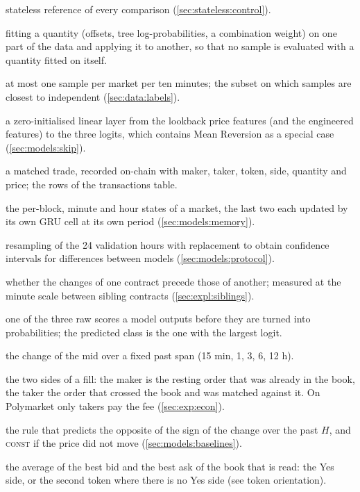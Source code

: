 \begin{description}[nosep, font=\normalfont\itshape, leftmargin=3.2cm, style=nextline]
  stateless reference of every comparison (\cref{sec:stateless:control}).
  \item[cross-fitting] fitting a quantity (offsets, tree log-probabilities, a combination
  weight) on one part of the data and applying it to another, so that no sample is
  evaluated with a quantity fitted on itself.
  \item[deduplicated samples] at most one sample per market per ten minutes; the subset
  on which samples are closest to independent (\cref{sec:data:labels}).
  \item[direct path] a zero-initialised linear layer from the lookback price features (and
  the engineered features) to the three logits, which contains Mean Reversion as a special case
  (\cref{sec:models:skip}).
  \item[fill] a matched trade, recorded on-chain with maker, taker, token, side, quantity
  and price; the rows of the transactions table.
  \item[hierarchical memory] the per-block, minute and hour states of a market, the last
  two each updated by its own GRU cell at its own period (\cref{sec:models:memory}).
  \item[hour-block bootstrap] resampling of the 24 validation hours with replacement to
  obtain confidence intervals for differences between models (\cref{sec:models:protocol}).
  \item[lead--lag] whether the changes of one contract precede those of another;
  measured at the minute scale between sibling contracts (\cref{sec:expl:siblings}).
  \item[logit] one of the three raw scores a model outputs before they are turned into
  probabilities; the predicted class is the one with the largest logit.
  \item[lookback] the change of the mid over a fixed past span (15 min, 1, 3, 6, 12 h).
  \item[maker, taker] the two sides of a fill: the maker is the resting order that was
  already in the book, the taker the order that crossed the book and was matched against
  it.  On Polymarket only takers pay the fee (\cref{sec:exp:econ}).
  \item[Mean Reversion-$H$] the rule that predicts the opposite of the sign of the change
  over the past $H$, and \textsc{const} if the price did not move (\cref{sec:models:baselines}).
  \item[mid price] the average of the best bid and the best ask of the book that is read:
  the Yes side, or the second token where there is no Yes side (see token orientation).

\end{description}
